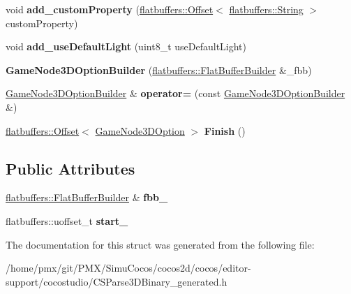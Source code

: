 \begin{DoxyCompactItemize}
void {\bfseries add\+\_\+custom\+Property} (\hyperlink{structflatbuffers_1_1Offset}{flatbuffers\+::\+Offset}$<$ \hyperlink{structflatbuffers_1_1String}{flatbuffers\+::\+String} $>$ custom\+Property)
\item 
\mbox{\label{structflatbuffers_1_1GameNode3DOptionBuilder_a5c650bcffbdc77047a3fc2f924017358}} 
void {\bfseries add\+\_\+use\+Default\+Light} (uint8\+\_\+t use\+Default\+Light)
\item 
\mbox{\label{structflatbuffers_1_1GameNode3DOptionBuilder_a21292d102663eb8325d150c126841de4}} 
{\bfseries Game\+Node3\+D\+Option\+Builder} (\hyperlink{classflatbuffers_1_1FlatBufferBuilder}{flatbuffers\+::\+Flat\+Buffer\+Builder} \&\+\_\+fbb)
\item 
\mbox{\label{structflatbuffers_1_1GameNode3DOptionBuilder_afd011ea3d9112fd1ba8b7d993a74f5e4}} 
\hyperlink{structflatbuffers_1_1GameNode3DOptionBuilder}{Game\+Node3\+D\+Option\+Builder} \& {\bfseries operator=} (const \hyperlink{structflatbuffers_1_1GameNode3DOptionBuilder}{Game\+Node3\+D\+Option\+Builder} \&)
\item 
\mbox{\label{structflatbuffers_1_1GameNode3DOptionBuilder_a7d80223a44c64eafa01b208cd3f773ff}} 
\hyperlink{structflatbuffers_1_1Offset}{flatbuffers\+::\+Offset}$<$ \hyperlink{structflatbuffers_1_1GameNode3DOption}{Game\+Node3\+D\+Option} $>$ {\bfseries Finish} ()
\end{DoxyCompactItemize}
\subsection*{Public Attributes}
\begin{DoxyCompactItemize}
\item 
\mbox{\label{structflatbuffers_1_1GameNode3DOptionBuilder_ab63fbb5ef1046c54073aeb6adf22e485}} 
\hyperlink{classflatbuffers_1_1FlatBufferBuilder}{flatbuffers\+::\+Flat\+Buffer\+Builder} \& {\bfseries fbb\+\_\+}
\item 
\mbox{\label{structflatbuffers_1_1GameNode3DOptionBuilder_a8dc9bd79129d2b361ed2ff022c9a54be}} 
flatbuffers\+::uoffset\+\_\+t {\bfseries start\+\_\+}
\end{DoxyCompactItemize}


The documentation for this struct was generated from the following file\+:\begin{DoxyCompactItemize}
\item 
/home/pmx/git/\+P\+M\+X/\+Simu\+Cocos/cocos2d/cocos/editor-\/support/cocostudio/C\+S\+Parse3\+D\+Binary\+\_\+generated.\+h\end{DoxyCompactItemize}
